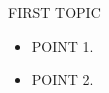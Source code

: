 %
\begin{frame}{FIRST TOPIC}
  \begin{itemize}
    \item POINT 1.
    \item POINT 2.
  \end{itemize}
\end{frame}



